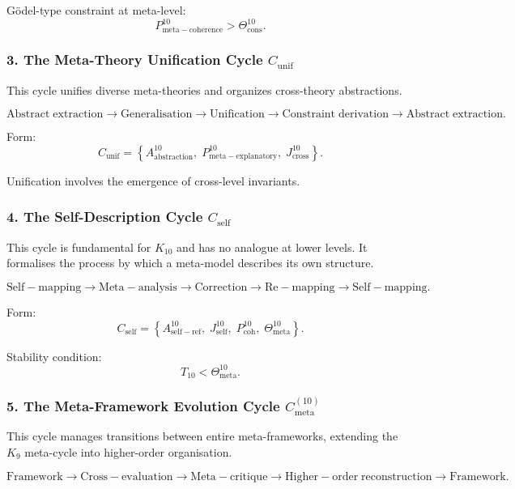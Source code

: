 Gödel-type constraint at meta-level:
\[
  P^{10}_{\mathrm{meta\!-\!coherence}}
    >
  \Theta^{10}_{\mathrm{cons}}.
\]


\subsubsection{3. The Meta-Theory Unification Cycle $C_{\mathrm{unif}}$}

This cycle unifies diverse meta-theories and organizes cross-theory
abstractions.

\[
  \mathrm{Abstract\;extraction}
  \to
  \mathrm{Generalisation}
  \to
  \mathrm{Unification}
  \to
  \mathrm{Constraint\;derivation}
  \to
  \mathrm{Abstract\;extraction}.
\]

Form:
\[
  C_{\mathrm{unif}}
    =
    \left\{
      A^{10}_{\mathrm{abstraction}},\;
      P^{10}_{\mathrm{meta\!-\!explanatory}},\;
      J^{10}_{\mathrm{cross}}
    \right\}.
\]

Unification involves the emergence of cross-level invariants.


\subsubsection{4. The Self-Description Cycle $C_{\mathrm{self}}$}

This cycle is fundamental for $K_{10}$ and has no analogue at lower levels.
It formalises the process by which a meta-model describes its own structure.

\[
  \mathrm{Self\!-\!mapping}
  \to
  \mathrm{Meta\!-\!analysis}
  \to
  \mathrm{Correction}
  \to
  \mathrm{Re\!-\!mapping}
  \to
  \mathrm{Self\!-\!mapping}.
\]

Form:
\[
  C_{\mathrm{self}}
    =
    \left\{
      A^{10}_{\mathrm{self\!-\!ref}},\;
      J^{10}_{\mathrm{self}},\;
      P^{10}_{\mathrm{coh}},\;
      \Theta^{10}_{\mathrm{meta}}
    \right\}.
\]

Stability condition:
\[
  T_{10} < \Theta^{10}_{\mathrm{meta}}.
\]


\subsubsection{5. The Meta-Framework Evolution Cycle $C_{\mathrm{meta}}^{(10)}$}

This cycle manages transitions between entire meta-frameworks, extending the
$K_9$ meta-cycle into higher-order organisation.

\[
  \mathrm{Framework}
  \to
  \mathrm{Cross\!-\!evaluation}
  \to
  \mathrm{Meta\!-\!critique}
  \to
  \mathrm{Higher\!-\!order\;reconstruction}
  \to
  \mathrm{Framework}.
\]

